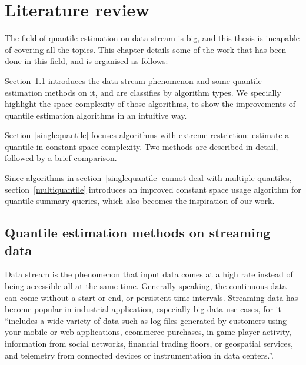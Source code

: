 % 



% 
\chapter{Literature review}
\label{ch: literature_review}


The field of quantile estimation on data stream is big, and this thesis is incapable of covering all the topics.
This chapter details some of the work that has been done in this field, and is organised as follows:

Section~\ref{streamingdata} introduces the data stream phenomenon and some quantile estimation methods on it, and are classifies by algorithm types. We specially highlight the space complexity of those algorithms, to show the improvements of quantile estimation algorithms in an intuitive way.

Section~\ref{singlequantile} focuses algorithms with extreme restriction: estimate a quantile in constant space complexity. Two methods are described in detail, followed by a brief comparison.

Since algorithms in section~\ref{singlequantile} cannot deal with multiple quantiles, section~\ref{multiquantile} introduces an improved constant space usage algorithm for quantile summary queries, which also becomes the inspiration of our work.

\section{Quantile estimation methods on streaming data}
\label{streamingdata}
Data stream is the phenomenon that input data comes at a high rate instead of being accessible all at the same time\cite{muthukrishnanDataStreamsAlgorithms2005}.
Generally speaking, the continuous data can come without a start or end, or persistent time intervals.
Streaming data has become popular in industrial application, especially big data use cases, for it
``includes a wide variety of data such as log files generated by customers using your mobile or web applications, ecommerce purchases, in-game player activity, information from social networks, financial trading floors, or geospatial services, and telemetry from connected devices or instrumentation in data centers.''\cite{WhatStreamingData}.

